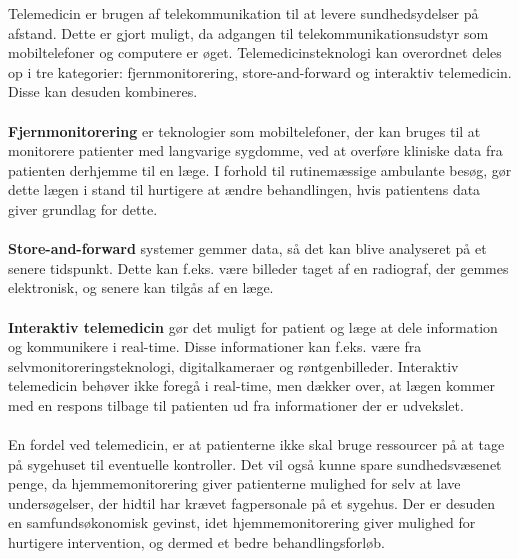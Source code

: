 Telemedicin er brugen af telekommunikation til at levere sundhedsydelser på afstand. Dette er gjort muligt, da adgangen til telekommunikationsudstyr som mobiltelefoner og computere er øget.
Telemedicinsteknologi kan overordnet deles op i tre kategorier: fjernmonitorering, store-and-forward og interaktiv telemedicin. Disse kan desuden kombineres.\\
\\
\textbf{Fjernmonitorering} er teknologier som mobiltelefoner, der kan bruges til at monitorere patienter med langvarige sygdomme, ved at overføre kliniske data fra patienten derhjemme til en læge. I forhold til rutinemæssige ambulante besøg, gør dette lægen i stand til hurtigere at ændre behandlingen, hvis patientens data giver grundlag for dette.\\
\\
\textbf{Store-and-forward} systemer gemmer data, så det kan blive analyseret på et senere tidspunkt. Dette kan f.eks. være billeder taget af en radiograf, der gemmes elektronisk, og senere kan tilgås af en læge.\\
\\
\textbf{Interaktiv telemedicin} gør det muligt for patient og læge at dele information og kommunikere i real-time. Disse informationer kan f.eks. være fra selvmonitoreringsteknologi, digitalkameraer og røntgenbilleder. Interaktiv telemedicin behøver ikke foregå i real-time, men dækker over, at lægen kommer med en respons tilbage til patienten ud fra informationer der er udvekslet.\\
\\
En fordel ved telemedicin, er at patienterne ikke skal bruge ressourcer på at tage på sygehuset til eventuelle kontroller. Det vil også kunne spare sundhedsvæsenet penge, da hjemmemonitorering giver patienterne mulighed for selv at lave undersøgelser, der hidtil har krævet fagpersonale på et sygehus. Der er desuden en samfundsøkonomisk gevinst, idet hjemmemonitorering giver mulighed for hurtigere intervention, og dermed et bedre behandlingsforløb.